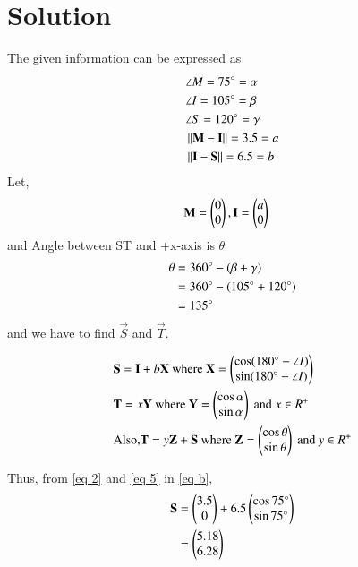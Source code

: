 \documentclass[journal,12pt,twocolumn]{IEEEtran}
\begin{document}
\section{Solution}
The given information can be expressed as
    \begin{align}
    &\angle M = 75\degree = \alpha \label{eq 1}
    \\
    &\angle I = 105\degree = \beta \label{eq 2}
    \\
    &\angle S = 120\degree = \gamma \label{eq 3}
    \\
    &\left\lVert\mathbf{M}-\mathbf{I}\right\rVert = 3.5 = a \label{eq 4}
    \\
    &\left\lVert\mathbf{I}-\mathbf{S}\right\rVert = 6.5 = b \label{eq 5}
    \end{align}
 Let, 
\begin{align}
&\mathbf{M}=\begin{pmatrix}0\\0\end{pmatrix},\mathbf{I}=\begin{pmatrix}a\\0\end{pmatrix}
\end{align}
and Angle between ST and +x-axis is $\theta$
\begin{align}
\theta &= 360\degree - (\beta + \gamma)\\
       &= 360\degree - (105\degree + 120\degree)\\
       &= 135\degree \label{eq a}
\end{align}
and we have to find $\vec{S}$ and $\vec{T}$.
\begin{lemma}
\begin{align}
&\mathbf{S} =\mathbf{I} + b\mathbf{X} \text{ where } \mathbf{X} = \begin{pmatrix}\cos (180\degree -\angle I)\\\sin (180\degree -\angle I)\end{pmatrix} \label{eq b}\\
&\mathbf{T} = x\mathbf{Y} \text{ where } \mathbf{Y} = \begin{pmatrix}\cos\alpha\\\sin \alpha\end{pmatrix}\text{ and } x \in R^{+} \label{eq c}\\
&\text{Also,} \mathbf{T} = y\mathbf{Z}+\mathbf{S} \text{ where } \mathbf{Z} =  \begin{pmatrix}\cos\theta\\\sin\theta\end{pmatrix} \text{ and }y \in R^{+} \label{eq d}
\end{align}
\end{lemma}
Thus, 
from  \eqref{eq 2} and \eqref{eq 5} in \eqref{eq b},
\begin{align}
\mathbf{S} &=\begin{pmatrix}3.5\\0\end{pmatrix} + 6.5\begin{pmatrix}\cos 75\degree \\\sin 75\degree \end{pmatrix}\label{eq e}
\\
&=\begin{pmatrix}5.18\\6.28\end{pmatrix}
\end{align}
\end{document}
